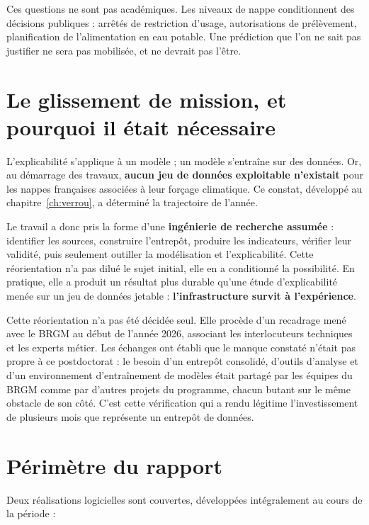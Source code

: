 Ces questions ne sont pas académiques. Les niveaux de nappe conditionnent des décisions
publiques : arrêtés de restriction d'usage, autorisations de prélèvement, planification de
l'alimentation en eau potable. Une prédiction que l'on ne sait pas justifier ne sera pas
mobilisée, et ne devrait pas l'être.

\section{Le glissement de mission, et pourquoi il était nécessaire}

L'explicabilité s'applique à un modèle ; un modèle s'entraîne sur des données. Or, au démarrage
des travaux, \textbf{aucun jeu de données exploitable n'existait} pour les nappes françaises
associées à leur forçage climatique. Ce constat, développé au chapitre~\ref{ch:verrou}, a
déterminé la trajectoire de l'année.

Le travail a donc pris la forme d'une \textbf{ingénierie de recherche assumée} : identifier les
sources, construire l'entrepôt, produire les indicateurs, vérifier leur validité, puis seulement
outiller la modélisation et l'explicabilité. Cette réorientation n'a pas dilué le sujet initial,
elle en a conditionné la possibilité. En pratique, elle a produit un résultat plus durable
qu'une étude d'explicabilité menée sur un jeu de données jetable : \textbf{l'infrastructure
survit à l'expérience}.

Cette réorientation n'a pas été décidée seul. Elle procède d'un recadrage mené avec le BRGM au
début de l'année 2026, associant les interlocuteurs techniques et les experts métier. Les
échanges ont établi que le manque constaté n'était pas propre à ce postdoctorat : le besoin d'un
entrepôt consolidé, d'outils d'analyse et d'un environnement d'entraînement de modèles était
partagé par les équipes du BRGM comme par d'autres projets du programme, chacun butant sur le
même obstacle de son côté. C'est cette vérification qui a rendu légitime l'investissement de
plusieurs mois que représente un entrepôt de données.

\section{Périmètre du rapport}

Deux réalisations logicielles sont couvertes, développées intégralement au cours de la période :

